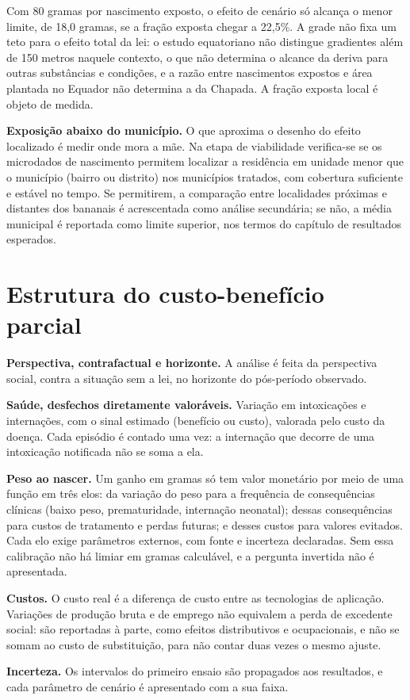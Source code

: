 Com 80 gramas por nascimento exposto, o efeito de cenário só alcança o menor
limite, de 18,0 gramas, se a fração exposta chegar a 22,5\%. A grade não fixa um
teto para o efeito total da lei: o estudo equatoriano não distingue gradientes
além de 150 metros naquele contexto, o que não determina o alcance da deriva
para outras substâncias e condições, e a razão entre nascimentos expostos e área
plantada no Equador não determina a da Chapada. A fração exposta local é objeto
de medida.

\textbf{Exposição abaixo do município.} O que aproxima o desenho do efeito
localizado é medir onde mora a mãe. Na etapa de viabilidade verifica-se se os
microdados de nascimento permitem localizar a residência em unidade menor que
o município (bairro ou distrito) nos municípios tratados, com cobertura
suficiente e estável no tempo. Se permitirem, a comparação entre localidades
próximas e distantes dos bananais é acrescentada como análise secundária; se
não, a média municipal é reportada como limite superior, nos termos do
capítulo de resultados esperados.

\section{Estrutura do custo-benefício parcial}

\textbf{Perspectiva, contrafactual e horizonte.} A análise é feita da
perspectiva social, contra a situação sem a lei, no horizonte do pós-período
observado.

\textbf{Saúde, desfechos diretamente valoráveis.} Variação em intoxicações e
internações, com o sinal estimado (benefício ou custo), valorada pelo custo da
doença. Cada episódio é contado uma vez: a internação
que decorre de uma intoxicação notificada não se soma a ela.

\textbf{Peso ao nascer.} Um ganho em gramas só tem valor monetário por meio de
uma função em três elos: da variação do peso para a frequência de consequências
clínicas (baixo peso, prematuridade, internação neonatal); dessas consequências
para custos de tratamento e perdas futuras; e desses custos para valores
evitados. Cada elo exige parâmetros externos, com fonte e incerteza declaradas.
Sem essa calibração não há limiar em gramas calculável, e a pergunta invertida
não é apresentada.

\textbf{Custos.} O custo real é a diferença de custo entre as tecnologias de
aplicação. Variações de produção bruta e de emprego não equivalem a perda de
excedente social: são reportadas à parte, como efeitos distributivos e
ocupacionais, e não se somam ao custo de substituição, para não contar duas
vezes o mesmo ajuste.

\textbf{Incerteza.} Os intervalos do primeiro ensaio são propagados aos
resultados, e cada parâmetro de cenário é apresentado com a sua faixa.
